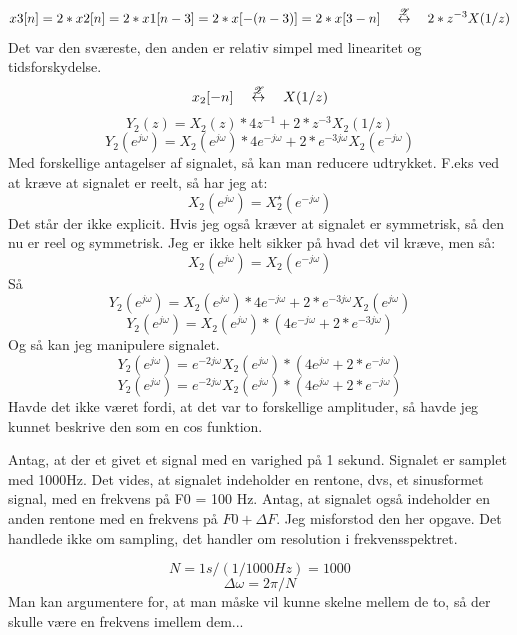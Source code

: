 \begin{EksamensOpgaver}
\begin{Eksamenssæt}[2021 - Rettet]
\begin{eksamensOpgave}
\begin{UnderOpgave}
                \[x3[n] = 2 * x2[n] = 2 * x1[n - 3] = 2 * x[-(n - 3)] = 2 * x[3 - n] \transformation{Z} 2 * z^{-3}X(1/z)\]
                Det var den sværeste, den anden er relativ simpel med linearitet og tidsforskydelse.
                \[x_2[-n] \transformation{Z} X(1/z)\]
                \[Y_2(z) = X_2(z) * 4 z^{-1} + 2 * z^{-3}X_2(1/z)\]
                \[Y_2(e^{j\omega}) = X_2(e^{j\omega}) * 4 e^{-j\omega} + 2 * e^{-3 j\omega}X_2(e^{-j\omega})\]
                Med forskellige antagelser af signalet, så kan man reducere udtrykket.
                F.eks ved at kræve at signalet er reelt, så har jeg at: 
                \[X_2(e^{j\omega}) = X_2^\star(e^{-j\omega})\]
                Det står der ikke explicit. 
                Hvis jeg også kræver at signalet er symmetrisk, så den nu er reel og symmetrisk. Jeg er ikke helt sikker på hvad det vil kræve, men så: 
                \[X_2(e^{j\omega}) = X_2(e^{-j\omega})\]
                Så
                \[Y_2(e^{j\omega}) = X_2(e^{j\omega}) * 4 e^{-j\omega} + 2 * e^{-3 j\omega}X_2(e^{j\omega})\]
                \[Y_2(e^{j\omega}) = X_2(e^{j\omega}) *( 4 e^{-j\omega} + 2 * e^{-3 j\omega})\]
                Og så kan jeg manipulere signalet.
                \[Y_2(e^{j\omega}) = e^{-2j\omega} X_2(e^{j\omega}) * ( 4 e^{j\omega} + 2 * e^{- j\omega})\]
                \[Y_2(e^{j\omega}) = e^{-2j\omega} X_2(e^{j\omega}) * ( 4 e^{j\omega} + 2 * e^{- j\omega})\]
                Havde det ikke været fordi, at det var to forskellige amplituder, så havde jeg kunnet beskrive den som en cos funktion. 
            \end{UnderOpgave}
        \end{eksamensOpgave}
        \begin{eksamensOpgave}
            Antag, at der et givet et signal med en varighed på 1 sekund. Signalet er samplet med 1000Hz. Det vides, at signalet indeholder en rentone, dvs, et sinusformet signal, med en frekvens
            på F0 = 100 Hz. Antag, at signalet også indeholder en anden rentone med en frekvens på $F0 + \Delta F$.
            Jeg misforstod den her opgave. Det handlede ikke om sampling, det handler om resolution i frekvensspektret.
            \begin{UnderOpgave}
                \[N = 1s/(1/1000Hz) = 1000\]
                \[\Delta \omega = 2\pi/N\]
                Man kan argumentere for, at man måske vil kunne skelne mellem de to, så der skulle være en frekvens imellem dem...

\end{UnderOpgave}
\end{eksamensOpgave}
\end{Eksamenssæt}
\end{EksamensOpgaver}
